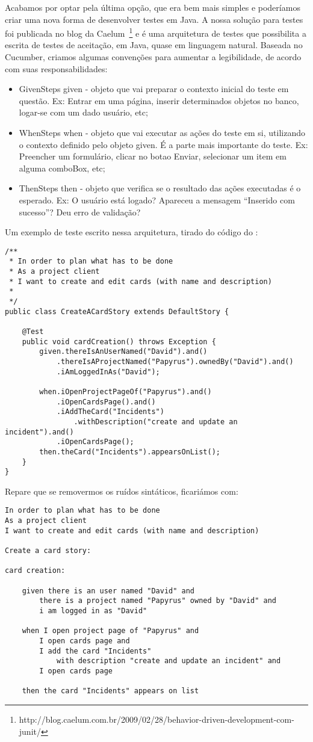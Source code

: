 Acabamos por optar pela última opção, que era bem mais simples e poderíamos criar uma nova forma de desenvolver testes em Java. A nossa solução para testes foi publicada no blog da Caelum~\footnote{http://blog.caelum.com.br/2009/02/28/behavior-driven-development-com-junit/} e é uma arquitetura de testes que possibilita a escrita de testes de aceitação, em Java, quase em linguagem natural. Baseada no Cucumber, criamos algumas convenções para aumentar a legibilidade, de acordo com suas responsabilidades:

\begin{itemize}
	\item{GivenSteps given - objeto que vai preparar o contexto inicial do teste em questão. Ex: Entrar em uma página, inserir determinados objetos no banco, logar-se com um dado usuário, etc;}
	\item{WhenSteps when - objeto que vai executar as ações do teste em si, utilizando o contexto definido pelo objeto given. É a parte mais importante do teste. Ex: Preencher um formulário, clicar no botao Enviar, selecionar um item em alguma comboBox, etc;}
	\item{ThenSteps then - objeto que verifica se o resultado das ações executadas é o esperado. Ex: O usuário está logado? Apareceu a mensagem ``Inserido com sucesso''? Deu erro de validação?}
\end{itemize}

Um exemplo de teste escrito nessa arquitetura, tirado do código do \calopsita:

\begin{lstlisting}
/**
 * In order to plan what has to be done
 * As a project client
 * I want to create and edit cards (with name and description)
 *
 */
public class CreateACardStory extends DefaultStory {

	@Test
	public void cardCreation() throws Exception {
		given.thereIsAnUserNamed("David").and()
			.thereIsAProjectNamed("Papyrus").ownedBy("David").and()
			.iAmLoggedInAs("David");

		when.iOpenProjectPageOf("Papyrus").and()
		    .iOpenCardsPage().and()
			.iAddTheCard("Incidents")
				.withDescription("create and update an incident").and()
			.iOpenCardsPage();
		then.theCard("Incidents").appearsOnList();
	}
}
\end{lstlisting}

Repare que se removermos os ruídos sintáticos, ficariámos com:

\begin{verbatim}
In order to plan what has to be done
As a project client
I want to create and edit cards (with name and description)

Create a card story:

card creation:
	
	given there is an user named "David" and
		there is a project named "Papyrus" owned by "David" and
		i am logged in as "David"

	when I open project page of "Papyrus" and
		I open cards page and
		I add the card "Incidents" 
			with description "create and update an incident" and
		I open cards page
			
	then the card "Incidents" appears on list
\end{verbatim}

